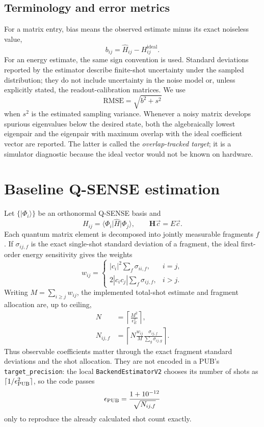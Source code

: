 \documentclass[11pt]{article}
\newcommand{\Hmat}{\mathbf{H}}
\newcommand{\code}[1]{\texttt{#1}}
\begin{document}
\subsection{Terminology and error metrics}

For a matrix entry, bias means the observed estimate minus its exact noiseless
value,
\[
  b_{ij}=\widehat H_{ij}-H_{ij}^{\mathrm{ideal}}.
\]
For an energy estimate, the same sign convention is used.  Standard
deviations reported by the estimator describe finite-shot uncertainty under
the sampled distribution; they do not include uncertainty in the noise model
or, unless explicitly stated, the readout-calibration matrices.  We use
\[
  \mathrm{RMSE}=\sqrt{b^2+s^2}
\]
when $s^2$ is the estimated sampling variance.  Whenever a noisy matrix
develops spurious eigenvalues below the desired state, both the algebraically
lowest eigenpair and the eigenpair with maximum overlap with the ideal
coefficient vector are reported.  The latter is called the
\emph{overlap-tracked target}; it is a simulator diagnostic because the ideal
vector would not be known on hardware.

\section{Baseline Q-SENSE estimation}

Let $\{\lvert\Phi_i\rangle\}$ be an orthonormal Q-SENSE basis and
\[
  H_{ij}=\langle\Phi_i\rvert\hat H\lvert\Phi_j\rangle,
  \qquad
  \Hmat\vec c=E\vec c.
\]
Each quantum matrix element is decomposed into jointly measurable fragments
$f$.  If $\sigma_{ij,f}$ is the exact single-shot standard deviation of a
fragment, the ideal first-order energy sensitivity gives the weights
\[
  w_{ij}=
  \begin{cases}
    |c_i|^2\sum_f\sigma_{ii,f},&i=j,\\
    2|c_i c_j|\sum_f\sigma_{ij,f},&i>j.
  \end{cases}
\]
Writing $M=\sum_{i\geq j}w_{ij}$, the implemented total-shot estimate and
fragment allocation are, up to ceiling,
\begin{align}
  N&=\left\lceil\frac{M^2}{\epsilon_E^2}\right\rceil,\\
  N_{ij,f}&=\left\lceil
    N\frac{w_{ij}}{M}
    \frac{\sigma_{ij,f}}{\sum_g\sigma_{ij,g}}
  \right\rceil.
\end{align}
Thus observable coefficients matter through the exact fragment standard
deviations and the shot allocation.  They are not encoded in a PUB's
\code{target\_precision}: the local \code{BackendEstimatorV2} chooses its
number of shots as $\lceil1/\epsilon_{\rm PUB}^2\rceil$, so the code passes
\[
  \epsilon_{\rm PUB}=\frac{1+10^{-12}}{\sqrt{N_{ij,f}}}
\]
only to reproduce the already calculated shot count exactly.
\end{document}
